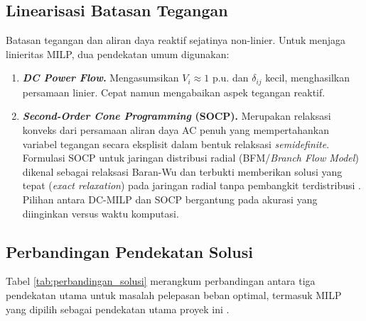 \subsection{Linearisasi Batasan Tegangan}
\label{subsec:Linearisasi_Batasan_Tegangan}

Batasan tegangan dan aliran daya reaktif sejatinya non-linier. Untuk menjaga linieritas MILP, dua pendekatan umum digunakan:

\begin{enumerate}
\item[a.] {\textbf{\textit{DC Power Flow}.} Mengasumsikan $V_{i}\approx1 \text{ p.u.}$ dan $\delta_{ij}$ kecil, menghasilkan persamaan linier. Cepat namun mengabaikan aspek tegangan reaktif}.

\item[b.] {\textbf{\textit{Second-Order Cone Programming} (SOCP).} Merupakan relaksasi konveks dari persamaan aliran daya AC penuh yang mempertahankan variabel tegangan secara eksplisit dalam bentuk relaksasi \textit{semidefinite}. Formulasi SOCP untuk jaringan distribusi radial (BFM/\textit{Branch Flow Model}) dikenal sebagai relaksasi Baran-Wu dan terbukti memberikan solusi yang tepat (\textit{exact relaxation}) pada jaringan radial tanpa pembangkit terdistribusi \cite{Farivar2013}. Pilihan antara DC-MILP dan SOCP bergantung pada akurasi yang diinginkan versus waktu komputasi}.
\end{enumerate}

\subsection{Perbandingan Pendekatan Solusi}
\label{subsec:Perbandingan_Pendekatan_Solusi}

Tabel \ref{tab:perbandingan_solusi} merangkum perbandingan antara tiga pendekatan utama untuk masalah pelepasan beban optimal, termasuk MILP yang dipilih sebagai pendekatan utama proyek ini \cite{Elsaadany2025, Arani2021, Zhou2024}.

